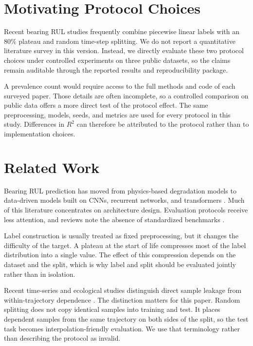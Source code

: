 \documentclass[pdflatex,sn-mathphys-num]{sn-jnl}
\begin{document}
\section{Motivating Protocol Choices}
Recent bearing RUL studies frequently combine piecewise linear labels with an 80\% plateau and random time-step splitting. We do not report a quantitative literature survey in this version. Instead, we directly evaluate these two protocol choices under controlled experiments on three public datasets, so the claims remain auditable through the reported results and reproducibility package.

A prevalence count would require access to the full methods and code of each surveyed paper. Those details are often incomplete, so a controlled comparison on public data offers a more direct test of the protocol effect. The same preprocessing, models, seeds, and metrics are used for every protocol in this study. Differences in $R^2$ can therefore be attributed to the protocol rather than to implementation choices.

\section{Related Work}
Bearing RUL prediction has moved from physics-based degradation models to data-driven models built on CNNs, recurrent networks, and transformers \cite{rul_lstm_uq_2022,reg_lstm_2021,transformer_tim_2023}. Much of this literature concentrates on architecture design. Evaluation protocols receive less attention, and reviews note the absence of standardized benchmarks \cite{zhao2021deep,caesarendra2021machine}.

Label construction is usually treated as fixed preprocessing, but it changes the difficulty of the target. A plateau at the start of life compresses most of the label distribution into a single value. The effect of this compression depends on the dataset and the split, which is why label and split should be evaluated jointly rather than in isolation.

Recent time-series and ecological studies distinguish direct sample leakage from within-trajectory dependence \cite{leakage_nature,leakage_frontiers}. The distinction matters for this paper. Random splitting does not copy identical samples into training and test. It places dependent samples from the same trajectory on both sides of the split, so the test task becomes interpolation-friendly evaluation. We use that terminology rather than describing the protocol as invalid.
\end{document}
